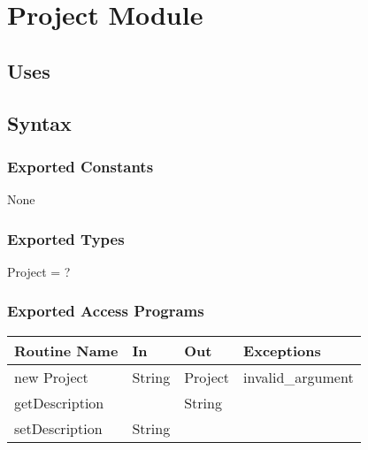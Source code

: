\documentclass[12pt, titlepage]{article}
\begin{document}
\newpage

\section* {Project Module}
\subsection* {Uses}

\subsection* {Syntax}

\subsubsection* {Exported Constants}

None

\subsubsection* {Exported Types}

Project = ?

\subsubsection* {Exported Access Programs}

\begin{tabular}{|l|l|l|l|}
    \hline
    \textbf{Routine Name} & \textbf{In} & \textbf{Out} & \textbf{Exceptions} \\
    \hline
    new Project & String & Project & invalid\_argument\\
    \hline
    getDescription & & String &\\
    \hline
    setDescription & String & &\\
    \hline
\end{tabular}
\end{document}
